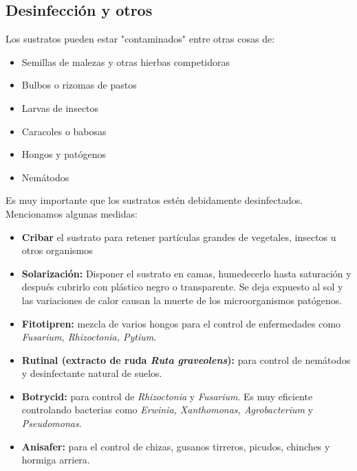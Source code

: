 \documentclass[a4paper,12pt,oneside]{article}
\begin{document}
\subsection{Desinfección y otros}
\label{sec:orgcafd650}
Los sustratos pueden estar "contaminados" entre otras cosas de:
\begin{itemize}
\item Semillas de malezas y otras hierbas competidoras
\item Bulbos o rizomas de pastos
\item Larvas de insectos
\item Caracoles o babosas
\item Hongos y patógenos
\item Nemátodos
\end{itemize}
Es muy importante que los sustratos estén debidamente desinfectados. Mencionamos
algunas medidas:
\begin{itemize}
\item \textbf{Cribar} el sustrato para retener partículas grandes de vegetales, insectos u
otros organismos
\item \textbf{Solarización:} Disponer el sustrato en camas, humedecerlo hasta saturación y
después cubrirlo con plástico negro o transparente. Se deja expuesto al sol y
las variaciones de calor causan la muerte de los microorganismos patógenos.
\item \textbf{Fitotipren:} mezcla de varios hongos para el control de enfermedades como
\emph{Fusarium, Rhizoctonia, Pytium}.
\item \textbf{Rutinal (extracto de ruda \emph{Ruta graveolens}):} para control de nemátodos y
desinfectante natural de suelos.
\item \textbf{Botrycid:} para control de \emph{Rhizoctonia} y \emph{Fusarium}. Es muy eficiente
controlando bacterias como \emph{Erwinia, Xanthomonas, Agrobacterium} y \emph{Pseudomonas}.
\item \textbf{Anisafer:} para el control de chizas, gusanos tirreros, picudos, chinches y
hormiga arriera.
\end{itemize}
\end{document}
